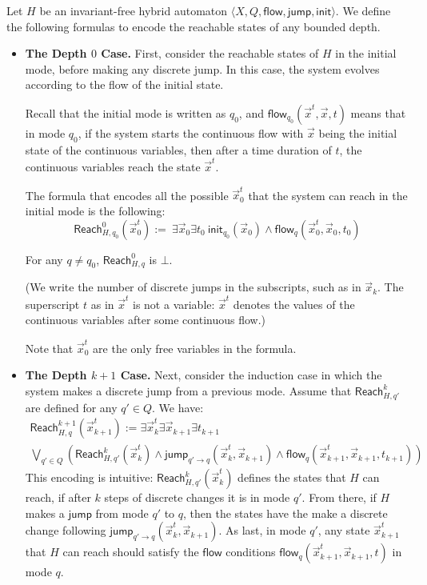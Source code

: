 \documentclass[envcountsect]{llncs}
\newcommand{\flow}{\mathsf{flow}}
\newcommand{\jump}{\mathsf{jump}}
\newcommand{\init}{\mathsf{init}}
\newcommand{\reach}{\mathsf{Reach}}
\begin{document}
\begin{definition}[$\reach_H^n(\vec x)$, Invariant-Free Case]

Let $H$ be an invariant-free hybrid automaton $\langle X, Q, \flow, \jump, \init\rangle$. We define the following formulas to encode the reachable states of any bounded depth.  

\begin{itemize}
\item {\bf The Depth $0$ Case.} First, consider the reachable states of $H$ in the initial mode, before making any discrete jump. In this case, the system evolves according to the flow of the initial state. 

Recall that the initial mode is written as $q_0$, and $\flow_{q_0}(\vec x^t, \vec x, t)$ means that in mode $q_0$, if the system starts the continuous flow with $\vec x$ being the initial state of the continuous variables, then after a time duration of $t$, the continuous variables reach the state $\vec x^t$. 

The formula that encodes all the possible $\vec x_0^t$ that the system can reach in the initial mode is the following:
\[
\reach^0_{H,q_0} (\vec x_0^t):=\ \exists \vec x_0 \exists t_0\ \init_{q_0}(\vec x_0)\wedge \flow_q(\vec x_0^t, \vec x_0, t_0)
\]

For any $q\neq q_0$, $\reach^0_{H,q}$ is $\bot$. 

(We write the number of discrete jumps in the subscripts, such as in $\vec x_k$. The superscript $t$ as in $\vec x^t$ is not a variable: $\vec x^t$ denotes the values of the continuous variables after some continuous flow.)


Note that $\vec x_0^t$ are the only free variables in the formula. 



\item {\bf The Depth $k+1$ Case.} Next, consider the induction case in which the system makes a discrete jump from a previous mode. Assume that $\reach^k_{H,q'}$ are defined for any $q'\in Q$. We have:
\begin{multline*}
\reach^{k+1}_{H,q}(\vec x_{k+1}^t):=  \exists \vec x_k^t\exists \vec x_{k+1}\exists t_{k+1}\ \\
\bigvee_{q'\in Q} (\reach^k_{H,q'} (\vec x_k^t) \wedge \jump_{q'\rightarrow q}(\vec x_k^t, \vec x_{k+1}) \wedge \flow_{q}(\vec x_{k+1}^t, \vec x_{k+1}, t_{k+1}))
\end{multline*}
This encoding is intuitive: $\reach_{H,q'}^k(\vec x_k^t)$ defines the states that $H$ can reach, if after $k$ steps of discrete changes it is in mode $q'$. From there, if $H$ makes a $\jump$ from mode $q'$ to $q$, then the states have the make a discrete change following $\jump_{q'\rightarrow q}(\vec x_k^t, \vec x_{k+1})$. As last, in mode $q'$, any state $\vec x_{k+1}^t$ that $H$ can reach should satisfy the $\flow$ conditions $\flow_q(\vec x_{k+1}^t, \vec x_{k+1}, t)$ in mode $q$.


\end{itemize}
\end{definition}
\end{document}
